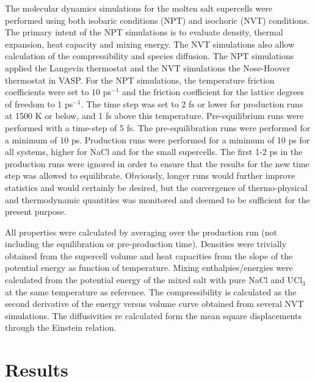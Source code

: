 \documentclass[preprint,3p,10pt,twocolumn,number,sort&compress]{elsarticle}
\begin{document}
The molecular dynamics simulations for the molten salt supercells were performed using both isobaric conditions (NPT) and isochoric (NVT) conditions. The primary intent of the NPT simulations is to evaluate density, thermal expansion, heat capacity and mixing energy. The NVT simulations also allow calculation of the compressibility and species diffusion. The NPT simulations applied the Langevin thermostat and the NVT simulations the Nose-Hoover thermostat in VASP. For the NPT simulations, the temperature friction coefficients were set to 10 ps$^{-1}$ and the friction coefficient for the lattice degrees of freedom to 1 ps$^{-1}$. The time step was set to 2 fs or lower for production runs at 1500 K or below, and 1 fs above this temperature. Pre-equilibrium runs were performed with a time-step of 5 fs. The pre-equilibration runs were performed for a minimum of 10 ps. Production runs were performed for a minimum of 10 ps for all systems, higher for NaCl and for the small supercells. The first 1-2 ps in the production runs were ignored in order to ensure that the results for the new time step was allowed to equilibrate. Obviously, longer runs would further improve statistics and would certainly be desired, but the convergence of thermo-physical and thermodynamic quantities was monitored and deemed to be sufficient for the present purpose.  

All properties were calculated by averaging over the production run (not including the equilibration or pre-production time). Densities were trivially obtained from the supercell volume and heat capacities from the slope of the potential energy as function of temperature. Mixing enthalpies/energies were calculated from the potential energy of the mixed salt with pure NaCl and UCl$_3$ at the same temperature as reference. The compressibility is calculated as the second derivative of the energy versus volume curve obtained from several NVT simulations. The diffusivities re calculated form the mean square displacements through the Einstein relation. 

\section{Results}
\label{sec:results}
\end{document}
